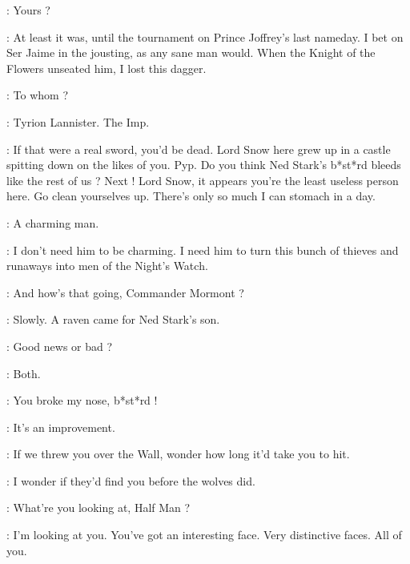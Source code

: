 \CATELYN: Yours ? 

\LITTLEFINGER: At least it was, until the tournament on Prince Joffrey's last nameday. I bet on Ser Jaime in the jousting, as any sane man would. When the Knight of the Flowers unseated him, I lost this dagger. 

\CATELYN: To whom ? 

\LITTLEFINGER: Tyrion Lannister. The Imp. 

\scene



\ALLISER: If that were a real sword, you'd be dead. Lord Snow here grew up in a castle spitting down on the likes of you. Pyp. Do you think Ned Stark's b*st*rd bleeds like the rest of us ?  Next !  Lord Snow, it appears you're the least useless person here. Go clean yourselves up. There's only so much I can stomach in a day. 


\TYRION: A charming man. 

\JEOR: I don't need him to be charming. I need him to turn this bunch of thieves and runaways into men of the Night's Watch. 

\TYRION: And how's that going, Commander Mormont ? 

\JEOR: Slowly. A raven came for Ned Stark's son. 

\TYRION: Good news or bad ? 

\JEOR: Both. 


\GRENN: You broke my nose, b*st*rd ! 

\JON: It's an improvement. 


\GRENN: If we threw you over the Wall, wonder how long it'd take you to hit. 

\PYP: I wonder if they'd find you before the wolves did. 

\GRENN:  What're you looking at, Half Man ? 

\TYRION: I'm looking at you. You've got an interesting face. Very distinctive faces. All of you. 


